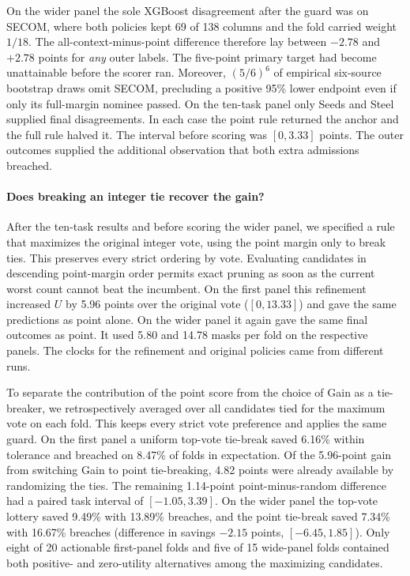 On the wider panel the sole XGBoost disagreement after the guard was on SECOM, where both policies kept 69 of 138 columns and the fold carried weight $1/18$. The all-context-minus-point difference therefore lay between $-2.78$ and $+2.78$ points for \emph{any} outer labels. The five-point primary target had become unattainable before the scorer ran. Moreover, $(5/6)^6$ of empirical six-source bootstrap draws omit SECOM, precluding a positive 95\% lower endpoint even if only its full-margin nominee passed. On the ten-task panel only Seeds and Steel supplied final disagreements. In each case the point rule returned the anchor and the full rule halved it. The interval before scoring was $[0,3.33]$ points. The outer outcomes supplied the additional observation that both extra admissions breached.

\paragraph{Does breaking an integer tie recover the gain?}
After the ten-task results and before scoring the wider panel, we specified a rule that maximizes the original integer vote, using the point margin only to break ties. This preserves every strict ordering by vote. Evaluating candidates in descending point-margin order permits exact pruning as soon as the current worst count cannot beat the incumbent. On the first panel this refinement increased $U$ by 5.96 points over the original vote ($[0,13.33]$) and gave the same predictions as point alone. On the wider panel it again gave the same final outcomes as point. It used 5.80 and 14.78 masks per fold on the respective panels. The clocks for the refinement and original policies came from different runs.

To separate the contribution of the point score from the choice of Gain as a tie-breaker, we retrospectively averaged over all candidates tied for the maximum vote on each fold. This keeps every strict vote preference and applies the same guard. On the first panel a uniform top-vote tie-break saved 6.16\% within tolerance and breached on 8.47\% of folds in expectation. Of the 5.96-point gain from switching Gain to point tie-breaking, 4.82 points were already available by randomizing the ties. The remaining 1.14-point point-minus-random difference had a paired task interval of $[-1.05,3.39]$. On the wider panel the top-vote lottery saved 9.49\% with 13.89\% breaches, and the point tie-break saved 7.34\% with 16.67\% breaches (difference in savings $-2.15$ points, $[-6.45,1.85]$). Only eight of 20 actionable first-panel folds and five of 15 wide-panel folds contained both positive- and zero-utility alternatives among the maximizing candidates.

